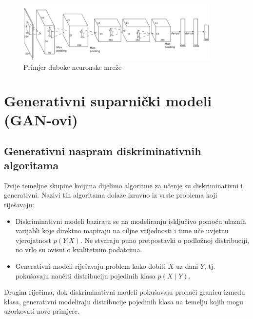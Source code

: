 \documentclass[lmodern, utf8, seminar]{fer}
\begin{document}
\begin{figure}[H]
    \centering
    \includegraphics[width=0.9\textwidth]{dnn}
    \caption{Primjer duboke neuronske mreže}
    \label{fig:dnn}
\end{figure}

\chapter{Generativni suparnički modeli (GAN-ovi)}
\section{Generativni naspram diskriminativnih algoritama}
Dvije temeljne skupine koijima dijelimo algoritme za učenje su diskriminativni i generativni.
Nazivi tih algoritama dolaze izravno iz vrste problema koji riješavaju: 
\newline

\renewcommand{\labelitemi}{\textbullet}
\begin{itemize} 
\item Diskriminativni modeli baziraju se na modeliranju isključivo pomoću ulaznih varijabli koje direktno mapiraju na ciljne vrijednosti i time uče uvjetnu vjerojatnost $p(Y|X)$. Ne stvaraju puno pretpostavki o podložnoj distribuciji, no vrlo su ovisni o kvalitetnim podatcima. 

\item Generativni modeli riješavaju problem kako dobiti $X$ uz dani $Y$, tj. pokušavaju naučiti distribuciju pojedinih klasa $p(X\mid Y)$.
\newline
\end{itemize}

Drugim riječima, dok diskriminativni modeli pokušavaju pronaći granicu između klasa, generativni modeliraju distribucije pojedinih klasa na temelju kojih mogu uzorkovati nove primjere.
\newline
\end{document}
